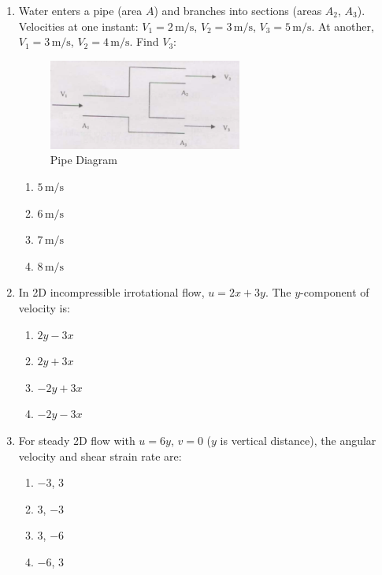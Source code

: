 \documentclass[journal,cmex10]{IEEEtran}
\theoremstyle{remark}
\numberwithin{equation}{enumi}
\numberwithin{figure}{enumi}
\begin{document}
\begin{enumerate}[label=\arabic*)]
\vspace{0.5cm}
\item Water enters a pipe (area $A$) and branches into sections (areas $A_2$, $A_3$). Velocities at one instant: $V_1=2\,\text{m/s}$, $V_2=3\,\text{m/s}$, $V_3=5\,\text{m/s}$. At another, $V_1=3\,\text{m/s}$, $V_2=4\,\text{m/s}$. Find $V_3$:  
\begin{figure}[htbp]
  \centering
  \includegraphics[width=0.6\textwidth]{figs/D/fig1.png}
  \caption{Pipe Diagram}
  \label{D/fig1.png}
\end{figure}
\hfill{}
\begin{enumerate}[label=\alph*)]
    \item $5\,\text{m/s}$
    \item $6\,\text{m/s}$
    \item $7\,\text{m/s}$
    \item $8\,\text{m/s}$
\end{enumerate}

\vspace{0.5cm}
\item In 2D incompressible irrotational flow, $u = 2x + 3y$. The $y$-component of velocity is:  
\hfill{}
\begin{enumerate}[label=\alph*)]
    \item $2y - 3x$
    \item $2y + 3x$
    \item $-2y + 3x$
    \item $-2y - 3x$
\end{enumerate}

\vspace{0.5cm}
\item For steady 2D flow with $u=6y$, $v=0$ ($y$ is vertical distance), the angular velocity and shear strain rate are:
\hfill{}
\begin{enumerate}[label=\alph*)]
    \item $-3$, $3$
    \item $3$, $-3$
    \item $3$, $-6$
    \item $-6$, $3$
\end{enumerate}


\end{enumerate}
\end{document}
